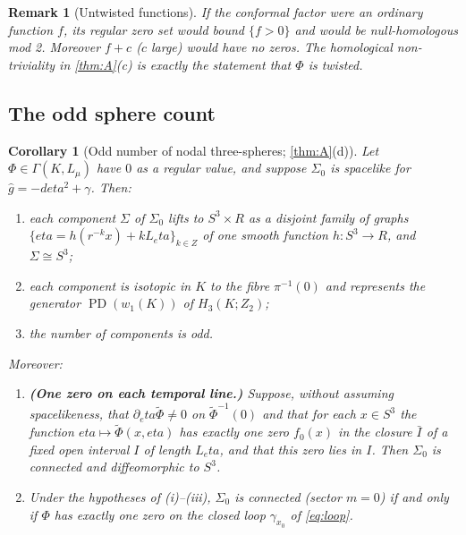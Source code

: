 \documentclass[11pt]{article}
\theoremstyle{canonmath}
\newtheorem{corollary}[theorem]{Corollary}
\newtheorem{remark}[theorem]{Remark}
\theoremstyle{canonpostulate}
\theoremstyle{canonproposition}
\theoremstyle{canonmath}
\theoremstyle{canonproposition}
\providecommand{\Lmu}{\mathcal{L}_\mu}
\providecommand{\PD}{\operatorname{PD}}
\providecommand{\Klein}{\mathcal{K}}
\providecommand{\R}{\mathbb{R}}
\providecommand{\Z}{\mathbb{Z}}
\providecommand{\Ztwo}{\mathbb{Z}_2}
\def\mathbb#1{#1}%
\def\mathcal#1{#1}%
\def\eta{eta}%
\begin{document}
\begin{remark}[Untwisted functions]
If the conformal factor were an ordinary function $f$, its regular zero set would bound $\{f>0\}$ and would be null-homologous mod 2. Moreover $f + c$ ($c$ large) would have no zeros. The homological non-triviality in \cref{thm:A}(c) is exactly the statement that $\Phi$ is twisted.
\end{remark}

\subsection{The odd sphere count}

\begin{corollary}[Odd number of nodal three-spheres; \cref{thm:A}(d)]\label{cor:odd}
Let $\Phi\in\Gamma(\Klein,\Lmu)$ have $0$ as a regular value, and suppose $\Sigma_0$ is spacelike for $\hat{g} = -d\eta^2 + \gamma$. Then:
\begin{enumerate}[label=(\roman*)]
\item each component $\Sigma$ of $\Sigma_0$ lifts to $S^3\times\R$ as a disjoint family of graphs $\{\eta = h(r^{-k}x) + kL_\eta\}_{k\in\Z}$ of one smooth function $h: S^3\to\R$, and $\Sigma \cong S^3$;
\item each component is isotopic in $\Klein$ to the fibre $\pi^{-1}(0)$ and represents the generator $\PD(w_1(\Klein))$ of $H_3(\Klein;\Ztwo)$;
\item the number of components is odd.
\end{enumerate}
Moreover:
\begin{enumerate}[label=(\roman*),resume]
\item \textbf{(One zero on each temporal line.)} Suppose, without assuming spacelikeness, that $\partial_\eta\widetilde\Phi\neq0$ on $\widetilde\Phi^{-1}(0)$ and that for each $x\in S^3$ the function $\eta\mapsto\widetilde\Phi(x,\eta)$ has exactly one zero $f_0(x)$ in the closure $\bar I$ of a fixed open interval $I$ of length $L_\eta$, and that this zero lies in $I$. Then $\Sigma_0$ is connected and diffeomorphic to $S^3$.
\item Under the hypotheses of (i)--(iii), $\Sigma_0$ is connected (sector $m=0$) if and only if $\Phi$ has exactly one zero on the closed loop $\gamma_{x_0}$ of \eqref{eq:loop}.
\end{enumerate}
\end{corollary}
\end{document}
